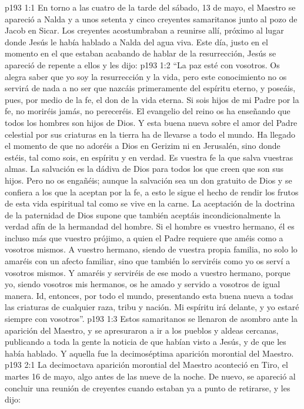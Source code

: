 \vs p193 1:1 En torno a las cuatro de la tarde del sábado, 13 de mayo, el Maestro se apareció a Nalda y a unos setenta y cinco creyentes samaritanos junto al pozo de Jacob en Sicar. Los creyentes acostumbraban a reunirse allí, próximo al lugar donde Jesús le había hablado a Nalda del agua viva. Este día, justo en el momento en el que estaban acabando de hablar de la resurrección, Jesús se apareció de repente a ellos y les dijo:
\vs p193 1:2 \pc “La paz esté con vosotros. Os alegra saber que yo soy la resurrección y la vida, pero este conocimiento no os servirá de nada a no ser que nazcáis primeramente del espíritu eterno, y poseáis, pues, por medio de la fe, el don de la vida eterna. Si sois hijos de mi Padre por la fe, no moriréis jamás, no pereceréis. El evangelio del reino os ha enseñando que todos los hombres son hijos de Dios. Y esta buena nueva sobre el amor del Padre celestial por sus criaturas en la tierra ha de llevarse a todo el mundo. Ha llegado el momento de que no adoréis a Dios en Gerizim ni en Jerusalén, sino donde estéis, tal como sois, en espíritu y en verdad. Es vuestra fe la que salva vuestras almas. La salvación es la dádiva de Dios para todos los que creen que son sus hijos. Pero no os engañéis; aunque la salvación sea un don gratuito de Dios y se confiera a los que la aceptan por la fe, a esto le sigue el hecho de rendir los frutos de esta vida espiritual tal como se vive en la carne. La aceptación de la doctrina de la paternidad de Dios supone que también aceptáis incondicionalmente la verdad afín de la hermandad del hombre. Si el hombre es vuestro hermano, él es incluso más que vuestro prójimo, a quien el Padre requiere que améis como a vosotros mismos. A vuestro hermano, siendo de vuestra propia familia, no solo lo amaréis con un afecto familiar, sino que también lo serviréis como yo os serví a vosotros mismos. Y amaréis y serviréis de ese modo a vuestro hermano, porque yo, siendo vosotros mis hermanos, os he amado y servido a vosotros de igual manera. Id, entonces, por todo el mundo, presentando esta buena nueva a todas las criaturas de cualquier raza, tribu y nación. Mi espíritu irá delante, y yo estaré siempre con vosotros”.
\vs p193 1:3 \pc Estos samaritanos se llenaron de asombro ante la aparición del Maestro, y se apresuraron a ir a los pueblos y aldeas cercanas, publicando a toda la gente la noticia de que habían visto a Jesús, y de que les había hablado. Y aquella fue la decimoséptima aparición morontial del Maestro.
\vs p193 2:1 La decimoctava aparición morontial del Maestro aconteció en Tiro, el martes 16 de mayo, algo antes de las nueve de la noche. De nuevo, se apareció al concluir una reunión de creyentes cuando estaban ya a punto de retirarse, y les dijo:
